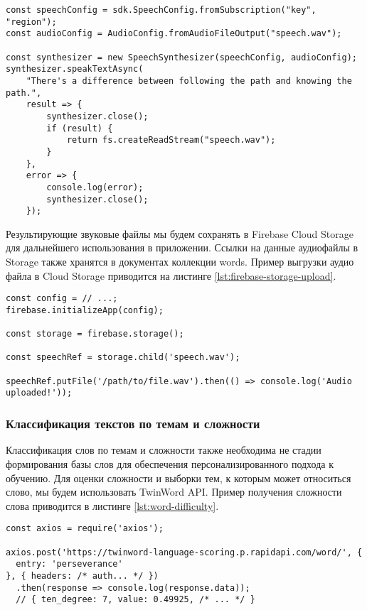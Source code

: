 \begin{lstlisting}[basicstyle=\fontsize{11}{11}\selectfont,tabsize=4,breaklines=true,caption={Пример проверки произношения с помощью Azure.},captionpos=b,label={lst:azure-pronunciation}]
const speechConfig = sdk.SpeechConfig.fromSubscription("key", "region");
const audioConfig = AudioConfig.fromAudioFileOutput("speech.wav");

const synthesizer = new SpeechSynthesizer(speechConfig, audioConfig);
synthesizer.speakTextAsync(
    "There's a difference between following the path and knowing the path.",
    result => {
        synthesizer.close();
        if (result) {
            return fs.createReadStream("speech.wav");
        }
    },
    error => {
        console.log(error);
        synthesizer.close();
    });
\end{lstlisting}

Результирующие звуковые файлы мы будем сохранять в Firebase Cloud Storage для дальнейшего использования в приложении. Ссылки на данные аудиофайлы в Storage также хранятся в документах коллекции words. Пример выгрузки аудио файла в Cloud Storage приводится на листинге \ref{lst:firebase-storage-upload}.

\begin{lstlisting}[basicstyle=\fontsize{11}{11}\selectfont,tabsize=4,breaklines=true,caption={Пример выгрузки аудио в Cloud Storage.},captionpos=b,label={lst:firebase-storage-upload}]
const config = // ...;
firebase.initializeApp(config);

const storage = firebase.storage();

const speechRef = storage.child('speech.wav');

speechRef.putFile('/path/to/file.wav').then(() => console.log('Audio uploaded!'));
\end{lstlisting}

\subsubsection{Классификация текстов по темам и сложности}
Классификация слов по темам и сложности также необходима не стадии формирования базы слов для обеспечения персонализированного подхода к обучению. Для оценки сложности и выборки тем, к которым может относиться слово, мы будем использовать TwinWord API\cite{twinword-overview}. Пример получения сложности слова приводится в листинге \ref{lst:word-difficulty}.

\begin{lstlisting}[basicstyle=\fontsize{11}{11}\selectfont,tabsize=4,breaklines=true,caption={Пример получения сложности слова.},captionpos=b,label={lst:word-difficulty}]
const axios = require('axios');

axios.post('https://twinword-language-scoring.p.rapidapi.com/word/', {
  entry: 'perseverance'
}, { headers: /* auth... */ })
  .then(response => console.log(response.data));
  // { ten_degree: 7, value: 0.49925, /* ... */ }
\end{lstlisting}

